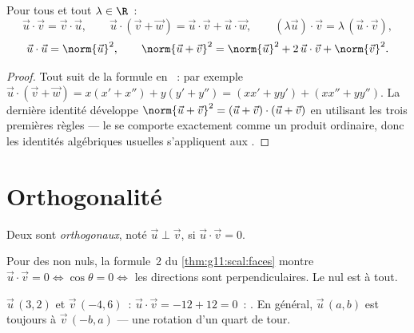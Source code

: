 \begin{proposition}\label{prop:g11:scal:rules}
Pour tous  et tout $\lambda \in \R$~:
\[
\vec u \cdot \vec v = \vec v \cdot \vec u, \qquad
\vec u \cdot (\vec v + \vec w) = \vec u \cdot \vec v + \vec u \cdot
\vec w, \qquad
(\lambda \vec u)\cdot \vec v = \lambda\,(\vec u \cdot \vec v),
\]
\[
\vec u \cdot \vec u = \norm{\vec u}^2,
\qquad
\norm{\vec u + \vec v}^2 = \norm{\vec u}^2 + 2\,\vec u\cdot\vec v +
\norm{\vec v}^2 .
\]
\end{proposition}

\begin{proof}
Tout suit de la formule en ~: par exemple
$\vec u \cdot (\vec v + \vec w) = x(x' + x'') + y(y' + y'') =
(xx' + yy') + (xx'' + yy'')$. La dernière identité développe
$\norm{\vec u + \vec v}^2 = (\vec u + \vec v)\cdot(\vec u + \vec v)$
en utilisant les trois premières règles --- le  se
comporte exactement comme un produit ordinaire, donc les identités
algébriques usuelles s'appliquent aux .
\end{proof}

\section{Orthogonalité}

\begin{definition}\label{def:g11:scal:orthogonal}
Deux  sont \emph{orthogonaux}, noté
$\vec u \perp \vec v$, si $\vec u \cdot \vec v = 0$.
\end{definition}

\begin{remark}
Pour des  non nuls, la formule~2 du \cref{thm:g11:scal:faces}
montre $\vec u \cdot \vec v = 0 \iff \cos\theta = 0 \iff$ les directions
sont perpendiculaires. Le  nul est  à tout.
\end{remark}

\begin{example}
$\vec u\,(3, 2)$ et $\vec v\,(-4, 6)$~: $\vec u \cdot \vec v = -12 + 12 =
0$~: . En général, $\vec u\,(a, b)$ est toujours  à
$\vec v\,(-b, a)$ --- une rotation d'un quart de tour.
\end{example}


